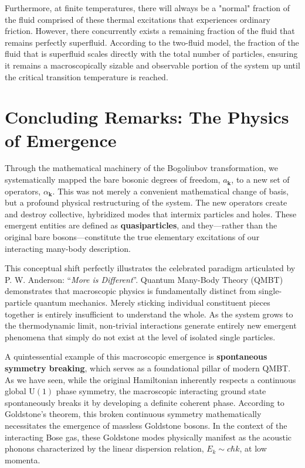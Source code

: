 Furthermore, at finite temperatures, there will always be a "normal" fraction of the fluid comprised of these thermal excitations that experiences ordinary friction. However, there concurrently exists a remaining fraction of the fluid that remains perfectly superfluid. According to the two-fluid model, the fraction of the fluid that is superfluid scales directly with the total number of particles, ensuring it remains a macroscopically sizable and observable portion of the system up until the critical transition temperature is reached.

\section*{Concluding Remarks: The Physics of Emergence}

Through the mathematical machinery of the Bogoliubov transformation, we systematically mapped the bare bosonic degrees of freedom, \( a_{\mathbf{k}} \), to a new set of operators, \( \alpha_{\mathbf{k}} \). This was not merely a convenient mathematical change of basis, but a profound physical restructuring of the system. The new operators create and destroy collective, hybridized modes that intermix particles and holes. These emergent entities are defined as \textbf{quasiparticles}, and they—rather than the original bare bosons—constitute the true elementary excitations of our interacting many-body description.

This conceptual shift perfectly illustrates the celebrated paradigm articulated by P. W. Anderson: ``\emph{More is Different}''. Quantum Many-Body Theory (QMBT) demonstrates that macroscopic physics is fundamentally distinct from single-particle quantum mechanics. Merely sticking individual constituent pieces together is entirely insufficient to understand the whole. As the system grows to the thermodynamic limit, non-trivial interactions generate entirely new emergent phenomena that simply do not exist at the level of isolated single particles.

A quintessential example of this macroscopic emergence is \textbf{spontaneous symmetry breaking}, which serves as a foundational pillar of modern QMBT. As we have seen, while the original Hamiltonian inherently respects a continuous global \( \text{U}(1) \) phase symmetry, the macroscopic interacting ground state spontaneously breaks it by developing a definite coherent phase. According to Goldstone's theorem, this broken continuous symmetry mathematically necessitates the emergence of massless Goldstone bosons. In the context of the interacting Bose gas, these Goldstone modes physically manifest as the acoustic phonons characterized by the linear dispersion relation, \( E_k \sim c\hbar k \), at low momenta.

